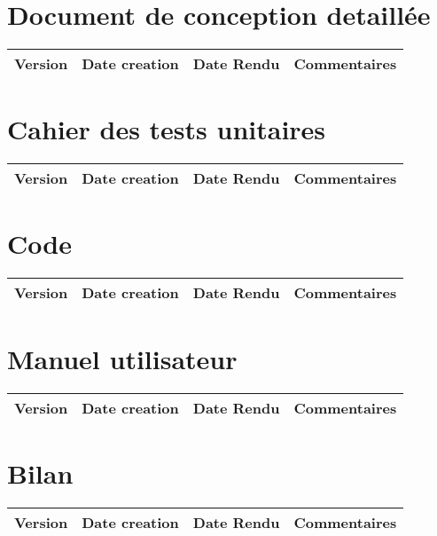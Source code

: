 \documentclass[fleqn, a4paper]{report}
\begin{document}
   \section*{Document de conception detaillée}
    \begin{tabular}{|c|c|c|c|}
      \hline
      Version & Date creation & Date Rendu & Commentaires\\
      \hline
    \end{tabular}  
    
   \section*{Cahier des tests unitaires}
    \begin{tabular}{|c|c|c|c|}
      \hline
      Version & Date creation & Date Rendu & Commentaires\\
      \hline
    \end{tabular}  
    
   \section*{Code}
    \begin{tabular}{|c|c|c|c|}
      \hline
      Version & Date creation & Date Rendu & Commentaires\\
      \hline
    \end{tabular}  
    
   \section*{Manuel utilisateur}
    \begin{tabular}{|c|c|c|c|}
      \hline
      Version & Date creation & Date Rendu & Commentaires\\
      \hline
    \end{tabular}  
    
   \section*{Bilan}
    \begin{tabular}{|c|c|c|c|}
      \hline
      Version & Date creation & Date Rendu & Commentaires\\
      \hline
    \end{tabular}  
\end{document}
